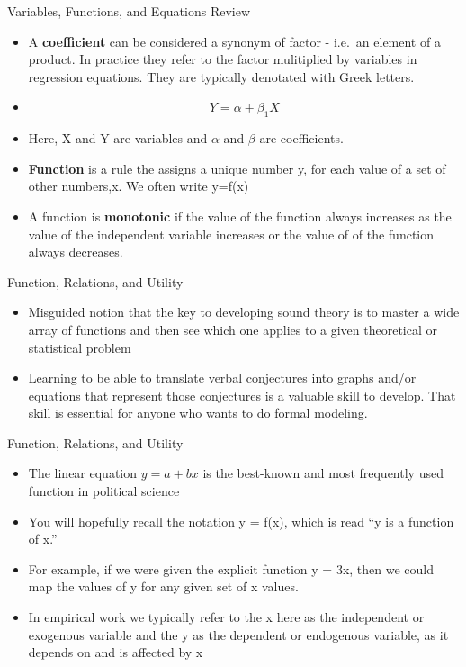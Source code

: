 \documentclass[
  ignorenonframetext,
]{beamer}
\begin{document}
\begin{frame}{Variables, Functions, and Equations Review}
\protect\hypertarget{variables-functions-and-equations-review}{}

\begin{itemize}
\item
  A \textbf{coefficient} can be considered a synonym of factor - i.e.~an
  element of a product. In practice they refer to the factor mulitiplied
  by variables in regression equations. They are typically denotated
  with Greek letters.
\item
  \[Y= \alpha + \beta_{1}X\]
\item
  Here, X and Y are variables and \(\alpha\) and \(\beta\) are
  coefficients.
\item
  \textbf{Function} is a rule the assigns a unique number y, for each
  value of a set of other numbers,x. We often write y=f(x)
\item
  A function is \textbf{monotonic} if the value of the function always
  increases as the value of the independent variable increases or the
  value of of the function always decreases.
\end{itemize}

\end{frame}

\begin{frame}{Function, Relations, and Utility}
\protect\hypertarget{function-relations-and-utility-1}{}

\begin{itemize}
\item
  Misguided notion that the key to developing sound theory is to master
  a wide array of functions and then see which one applies to a given
  theoretical or statistical problem
\item
  Learning to be able to translate verbal conjectures into graphs and/or
  equations that represent those conjectures is a valuable skill to
  develop. That skill is essential for anyone who wants to do formal
  modeling.
\end{itemize}

\end{frame}

\begin{frame}{Function, Relations, and Utility}
\protect\hypertarget{function-relations-and-utility-2}{}

\begin{itemize}
\item
  The linear equation \(y = a + bx\) is the best-known and most
  frequently used function in political science
\item
  You will hopefully recall the notation y = f(x), which is read ``y is
  a function of x.''
\item
  For example, if we were given the explicit function y = 3x, then we
  could map the values of y for any given set of x values.
\item
  In empirical work we typically refer to the x here as the independent
  or exogenous variable and the y as the dependent or endogenous
  variable, as it depends on and is affected by x
\end{itemize}

\end{frame}
\end{document}
